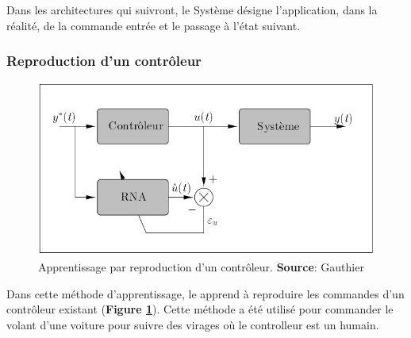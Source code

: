 Dans les architectures qui suivront, le Système désigne l'application, dans la réalité, de la commande entrée et le passage à l'état suivant.

\subsubsection{Reproduction d'un contrôleur}
\begin{figure}
 \centering
 \includegraphics[scale=0.5]{../figures/appsimple.jpg}
 \caption{Apprentissage par reproduction d'un contrôleur. \textbf{Source}: Gauthier\cite{Gauthier}}
 \label{appcontroleur}
\end{figure}
Dans cette méthode d'apprentissage, le \rna apprend à reproduire les commandes d'un contrôleur existant (\textbf{Figure \ref{appcontroleur}}).
Cette méthode a été utilisé pour commander le volant d'une voiture pour suivre des virages où le controlleur est un humain.\cite{Pomerleau}

